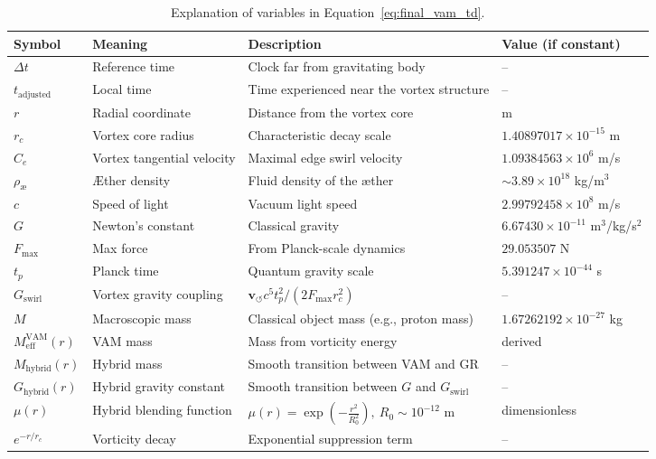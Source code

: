 \documentclass[12pt]{article}
\begin{document}
\begin{table}
    \centering
    \begin{tabular}{llll}
        \toprule
        \textbf{Symbol} & \textbf{Meaning} & \textbf{Description} & \textbf{Value (if constant)} \\
        \midrule
        $\Delta t$ & Reference time & Clock far from gravitating body & -- \\
        $t_\text{adjusted}$ & Local time & Time experienced near the vortex structure & -- \\
        $r$ & Radial coordinate & Distance from the vortex core & m \\
        $r_c$ & Vortex core radius & Characteristic decay scale & $1.40897017 \times 10^{-15}$ m \\
        $C_e$ & Vortex tangential velocity & Maximal edge swirl velocity & $1.09384563 \times 10^6$ m/s \\
        $\rho_\text{\ae}$ & Æther density & Fluid density of the æther & $\sim 3.89 \times 10^{18}$ kg/m$^3$ \\
        $c$ & Speed of light & Vacuum light speed & $2.99792458 \times 10^8$ m/s \\
        $G$ & Newton's constant & Classical gravity & $6.67430 \times 10^{-11}$ m$^3$/kg/s$^2$ \\
        $F_{\text{max}}$ & Max force & From Planck-scale dynamics & $29.053507$ N \\
        $t_p$ & Planck time & Quantum gravity scale & $5.391247 \times 10^{-44}$ s \\
        $G_\text{swirl}$ & Vortex gravity coupling & $\mathbf{v}_{\scriptscriptstyle\boldsymbol{\circlearrowleft}} c^5 t_p^2 / (2 F_{\text{max}} r_c^2)$ & -- \\
        $M$ & Macroscopic mass & Classical object mass (e.g., proton mass) & $1.67262192 \times 10^{-27}$ kg \\
        $M_{\text{eff}}^\text{VAM}(r)$ & VAM mass & Mass from vorticity energy & derived \\
        $M_{\text{hybrid}}(r)$ & Hybrid mass & Smooth transition between VAM and GR & -- \\
        $G_{\text{hybrid}}(r)$ & Hybrid gravity constant & Smooth transition between $G$ and $G_\text{swirl}$ & -- \\
        $\mu(r)$ & Hybrid blending function & $\mu(r) = \exp\left(-\frac{r^2}{R_0^2}\right),\ R_0 \sim 10^{-12}$ m & dimensionless \\
        $e^{-r/r_c}$ & Vorticity decay & Exponential suppression term & -- \\
        \bottomrule
    \end{tabular}
    \caption{Explanation of variables in Equation~\ref{eq:final_vam_td}.}
    \label{tab:time_dilation_variables}
\end{table}
\end{document}
